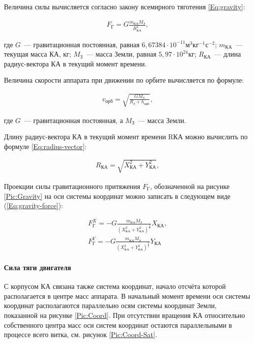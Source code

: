 \documentclass[12pt,a4paper]{article}
\begin{document}
Величина силы вычисляется согласно закону всемирного тяготения \ref{Eq:gravity}:

\begin{eqnarray}
  F_{\text{Г}} = G \frac{m_{\text{КА}} M_{\text{З}}}{R_{\text{КА}}^2}, \label{Eq:gravity}
\end{eqnarray}

где $G$~--- гравитационная постоянная, равная $6,67384 \cdot 10^{-11} \text{м}^3
\text{кг}^{-1} \text{с}^{-2}$; $m_{\text{КА}}$~--- текущая масса КА, кг; $M_{\text{З}}$~--–
масса Земли, равная $5,97 \cdot 10^{24} \text{кг}$; $R_{\text{КА}}$~--– длина радиус-вектора
КА в текущий момент времени.

Величина скорости аппарата при движении по орбите вычисляется по формуле:

\begin{eqnarray}
  v_{\text{орб}} = \sqrt{\frac{G M_{\text{З}}}{R_{\text{З}} + h_{\text{орб}}}}, \label{Eq:orbital-velocity}
\end{eqnarray}

где $G$~--- гравитационная постоянная, а $M_{\text{З}}$~--- масса Земли.

Длину радиус-вектора КА в текущий момент времени RКА можно вычислить по формуле
\ref{Eq:radius-vector}:

\begin{eqnarray}
  R_{\text{КА}} = \sqrt{X_{\text{КА}}^2 + Y_{\text{КА}}^2}, \label{Eq:radius-vector}
\end{eqnarray}

Проекции силы гравитационного притяжения $F_{\text{Г}}$, обозначенной на рисунке
\ref{Pic:Gravity} на оси системы координат можно записать в следующем виде
(\ref{Eq:gravity-force}):

\begin{eqnarray}
  F_{\text{Г}}^X = - G \frac{m_{\text{КА}} M_{\text{З}}}{\left(X_{\text{КА}}^2 +
    Y_{\text{КА}}^2\right)^{\frac{3}{2}}} X_{\text{КА}}, \nonumber \\
  F_{\text{Г}}^Y = - G \frac{m_{\text{КА}} M_{\text{З}}}{\left(X_{\text{КА}}^2 +
    Y_{\text{КА}}^2\right)^{\frac{3}{2}}} Y_{\text{КА}} \label{Eq:gravity-force}
\end{eqnarray}

\paragraph{Сила тяги двигателя} 

С корпусом КА связана также система координат, начало отсчёта которой располагается в
центре масс аппарата. В начальный момент времени оси системы координат располагаются
параллельно осям системы координат Земли, показанной на рисунке \ref{Pic:Coord}. При
отсутствии вращения КА относительно собственного центра масс оси систем координат остаются
параллельными в процессе всего витка, см. рисунок \ref{Pic:Coord-Sat}.
\end{document}
